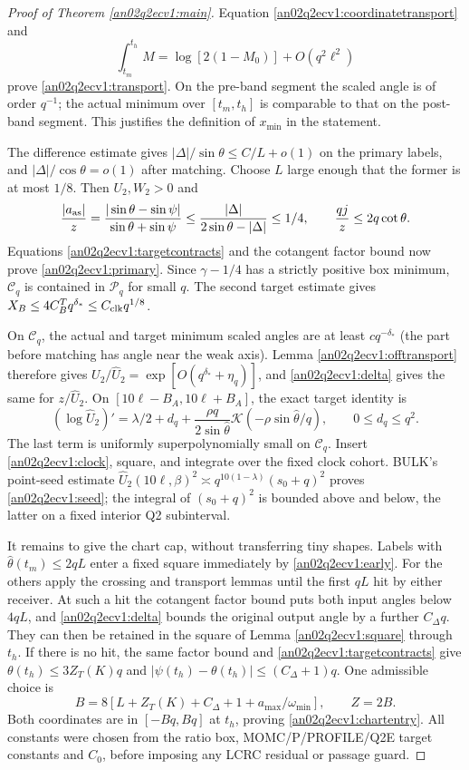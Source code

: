 \documentclass[11pt]{article}
\theoremstyle{remark}\newtheorem{remark}[theorem]{Remark}
\newcommand{\Cl}{\mathcal C_q}
\newcommand{\Kfun}{\mathcal K}
\begin{document}
\begin{proof}[Proof of Theorem \ref{an02q2ecv1:main}]
Equation \eqref{an02q2ecv1:coordinatetransport} and
\[
 \int_{t_m}^{t_h}M=\log[2(1-M_0)]+O(q^2\ell^2)
\]
prove \eqref{an02q2ecv1:transport}. On the pre-band segment the
scaled angle is of order $q^{-1}$; the actual minimum over
$[t_m,t_h]$ is comparable to that on the post-band segment.
This justifies the definition of $x_{\min}$ in the statement.

The difference estimate gives
$|\Delta|/\sin\theta\le C/L+o(1)$ on the primary labels,
and $|\Delta|/\cos\theta=o(1)$ after matching.
Choose $L$ large enough that the former is at most $1/8$.
Then $U_2,W_2>0$ and
\[
 \frac{|a_{\rm as}|}{z}
 =\frac{|\sin\theta-\sin\psi|}{\sin\theta+\sin\psi}
 \le\frac{|\Delta|}{2\sin\theta-|\Delta|}\le1/4,\qquad
 \frac{qj}{z}\le2q\cot\theta .
\]
Equations \eqref{an02q2ecv1:targetcontracts} and the cotangent
factor bound now prove \eqref{an02q2ecv1:primary}.
Since $\gamma-1/4$ has a strictly positive box minimum, $\Cl$
is contained in $\mathcal P_q$ for small $q$.
The second target estimate gives
$X_B\le4C_B^Tq^{\delta_*}\le C_{\rm clk}q^{1/8}$.

On $\Cl$, the actual and target minimum scaled angles are at least
$cq^{-\delta_*}$ (the part before matching has angle near the
weak axis). Lemma \ref{an02q2ecv1:offtransport} therefore gives
$U_2/\widehat U_2=\exp[O(q^{\delta_*}+\eta_q)]$,
and \eqref{an02q2ecv1:delta} gives the same for $z/\widehat U_2$.
On $[10\ell-B_A,10\ell+B_A]$, the exact target identity is
\[
 (\log\widehat U_2)'=
 \lambda/2+d_q+\frac{\rho q}{2\sin\widehat\theta}
          \Kfun(-\rho\sin\widehat\theta/q),\qquad 0\le d_q\le q^2 .
\]
The last term is uniformly superpolynomially small on $\Cl$.
Insert \eqref{an02q2ecv1:clock}, square, and integrate over the
fixed clock cohort. BULK's point-seed estimate
$\widehat U_2(10\ell,\beta)^2\asymp
q^{10(1-\lambda)}(s_0+q)^2$ proves
\eqref{an02q2ecv1:seed}; the integral of $(s_0+q)^2$ is bounded
above and below, the latter on a fixed interior Q2 subinterval.

It remains to give the chart cap, without transferring tiny shapes.
Labels with $\widehat\theta(t_m)\le2qL$ enter a fixed square
immediately by \eqref{an02q2ecv1:early}.
For the others apply the crossing and transport lemmas until
the first $qL$ hit by either receiver.
At such a hit the cotangent factor bound puts both input angles
below $4qL$, and \eqref{an02q2ecv1:delta} bounds the original
output angle by a further $C_\Delta q$.
They can then be retained in the square of Lemma
\ref{an02q2ecv1:square} through $t_h$.
If there is no hit, the same factor bound and
\eqref{an02q2ecv1:targetcontracts} give
$\theta(t_h)\le3Z_T(K)q$ and
$|\psi(t_h)-\theta(t_h)|\le(C_\Delta+1)q$.
One admissible choice is
\begin{equation}
 B=8\left[L+Z_T(K)+C_\Delta+1+a_{\max}/\omega_{\min}\right],
 \qquad Z=2B .
 \label{an02q2ecv1:Z}
\end{equation}
Both coordinates are in $[-Bq,Bq]$ at $t_h$, proving
\eqref{an02q2ecv1:chartentry}. All constants were chosen from
the ratio box, MOMC/P/PROFILE/Q2E target constants and $C_0$,
before imposing any LCRC residual or passage guard.
\end{proof}
\end{document}
